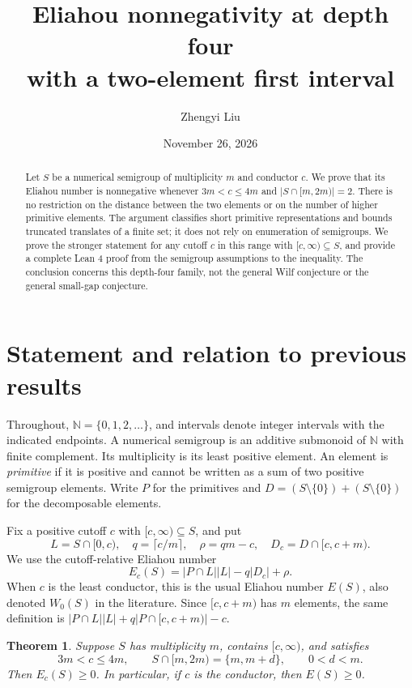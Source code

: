 \documentclass[11pt]{article}
\title{Eliahou nonnegativity at depth four\\with a two-element first interval}
\author{Zhengyi Liu}
\date{November 26, 2026}
\newtheorem{theorem}{Theorem}
\newcommand{\N}{\mathbb N}
\newcommand{\card}[1]{\lvert #1\rvert}
\begin{document}
\maketitle
\begin{abstract}
Let $S$ be a numerical semigroup of multiplicity $m$ and conductor $c$.
We prove that its Eliahou number is nonnegative whenever
$3m<c\leq4m$ and $\card{S\cap[m,2m)}=2$.
There is no restriction on the distance between the two elements or on
the number of higher primitive elements.
The argument classifies short primitive representations and bounds
truncated translates of a finite set; it does not rely on enumeration of
semigroups. We prove the stronger statement for any cutoff $c$ in this
range with $[c,\infty)\subseteq S$, and provide a complete Lean 4 proof
from the semigroup assumptions to the inequality. The conclusion concerns
this depth-four family, not the general Wilf conjecture or the general
small-gap conjecture.
\end{abstract}

\section{Statement and relation to previous results}

Throughout, $\N=\{0,1,2,\ldots\}$, and intervals denote integer intervals
with the indicated endpoints. A numerical semigroup is an additive
submonoid of $\N$ with finite complement. Its multiplicity is its least
positive element. An element is \emph{primitive} if it is positive and
cannot be written as a sum of two positive semigroup elements. Write
$P$ for the primitives and $D=(S\setminus\{0\})+(S\setminus\{0\})$ for
the decomposable elements.

Fix a positive cutoff $c$ with $[c,\infty)\subseteq S$, and put
\[
 L=S\cap[0,c),\quad q=\lceil c/m\rceil,\quad \rho=qm-c,\quad
 D_c=D\cap[c,c+m).
\]
We use the cutoff-relative Eliahou number
\[
 E_c(S)=\card{P\cap L}\card{L}-q\card{D_c}+\rho.
\]
When $c$ is the least conductor, this is the usual Eliahou number
$E(S)$, also denoted $W_0(S)$ in the literature. Since $[c,c+m)$
has $m$ elements, the same definition is
$\card{P\cap L}\card{L}+q\card{P\cap[c,c+m)}-c$.

\begin{theorem}\label{thm:main}
Suppose $S$ has multiplicity $m$, contains $[c,\infty)$, and satisfies
\[
 3m<c\leq4m,\qquad S\cap[m,2m)=\{m,m+d\},\qquad 0<d<m.
\]
Then $E_c(S)\geq0$.
In particular, if $c$ is the conductor, then $E(S)\geq0$.
\end{theorem}
\end{document}
